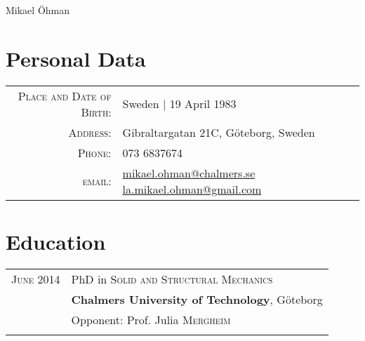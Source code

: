 \documentclass[a4paper,10pt]{article} %
\begin{document}
\pagestyle{empty} %



\par{{\centering
\Huge Mikael Öhman\bigskip
\par} %

\section{Personal Data}

\begin{tabular}{rl}
\textsc{Place and Date of Birth:} & Sweden  | 19 April 1983 \\
\textsc{Address:} & Gibraltargatan 21C, Göteborg, Sweden \\
\textsc{Phone:} & 073 6837674\\
\textsc{email:} & \href{mailto:mikael.ohman@chalmers.se}{mikael.ohman@chalmers.se} 
                  \href{mailto:la.mikael.ohman@gmail.com}{la.mikael.ohman@gmail.com}
\end{tabular}


\section{Education}

\begin{tabular}{rl}


\textsc{June} 2014 & PhD in \textsc{Solid and Structural Mechanics} \\
& \textbf{Chalmers University of Technology}, Göteborg\\
& \small Opponent: Prof. Julia \textsc{Mergheim}\\
&\\



\end{tabular}}
\end{document}
